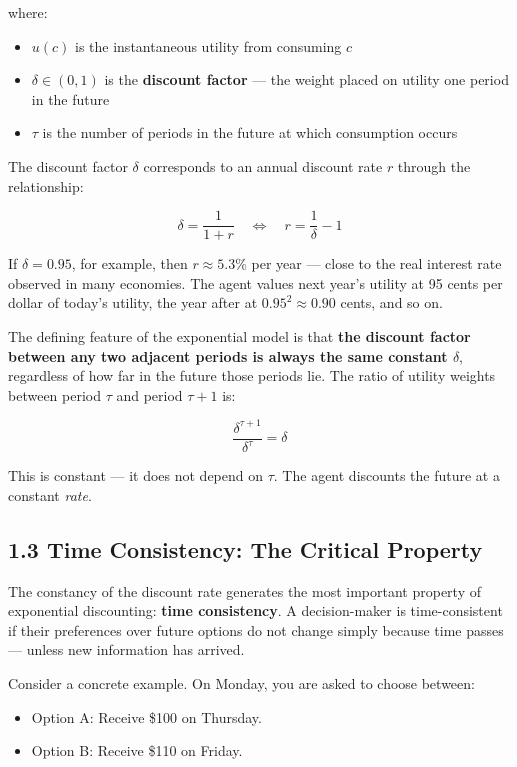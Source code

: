 \documentclass[12pt, letterpaper]{article}
\begin{document}
where:
\begin{itemize}
\item $u(c)$ is the instantaneous utility from consuming $c$
\item $\delta \in (0,1)$ is the \textbf{discount factor} --- the weight placed on utility one period in the future
\item $\tau$ is the number of periods in the future at which consumption occurs
\end{itemize}

The discount factor $\delta$ corresponds to an annual discount rate $r$ through the relationship:

$$\delta = \frac{1}{1+r} \quad \Leftrightarrow \quad r = \frac{1}{\delta} - 1$$

If $\delta = 0.95$, for example, then $r \approx 5.3\%$ per year --- close to the real interest rate observed in many economies. The agent values next year's utility at 95 cents per dollar of today's utility, the year after at $0.95^2 \approx 0.90$ cents, and so on.

The defining feature of the exponential model is that \textbf{the discount factor between any two adjacent periods is always the same constant $\delta$}, regardless of how far in the future those periods lie. The ratio of utility weights between period $\tau$ and period $\tau + 1$ is:

$$\frac{\delta^{\tau+1}}{\delta^\tau} = \delta$$

This is constant --- it does not depend on $\tau$. The agent discounts the future at a constant \textit{rate}.


\subsection{1.3 Time Consistency: The Critical Property}


The constancy of the discount rate generates the most important property of exponential discounting: \textbf{time consistency}. A decision-maker is time-consistent if their preferences over future options do not change simply because time passes --- unless new information has arrived.

Consider a concrete example. On Monday, you are asked to choose between:
\begin{itemize}
\item Option A: Receive \$100 on Thursday.
\item Option B: Receive \$110 on Friday.
\end{itemize}
\end{document}
